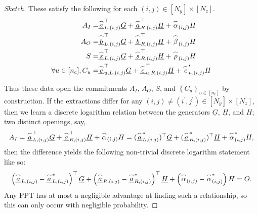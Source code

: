 \documentclass{article}
\theoremstyle{definition}
\begin{document}
\begin{proof}[Sketch]
These satisfy the following for each $(i, j) \in [N_y] \times [N_z]$.
\begin{align*}
A_I =& \underline{\overset{\LARGE \frown}{\small{a}}}_{L, (i,j)}^\top \underline{G} + \underline{\overset{\LARGE \frown}{\small{a}}}_{R, (i,j)}^\top \underline{H} + \overset{\LARGE \frown}{\small{\alpha}}_{(i,j)} H \\
A_O =& \underline{\overset{\LARGE \frown}{\small{b}}}_{L, (i,j)}^\top \underline{G} + \underline{\overset{\LARGE \frown}{\small{b}}}_{R, (i,j)}^\top \underline{H} + \overset{\LARGE \frown}{\small{\beta}}_{(i,j)} H  \\
S =& \underline{\overset{\LARGE \frown}{\small{s}}}_{L, (i,j)}^\top \underline{G} + \underline{\overset{\LARGE \frown}{\small{s}}}_{R, (i,j)}^\top \underline{H} + \overset{\LARGE \frown}{\small{\rho}}_{(i,j)} H  \\
\forall u \in [n_c],C_u =& \underline{\overset{\LARGE \frown}{\small{c}}}_{u,L, (i,j)}^\top \underline{G} + \underline{\overset{\LARGE \frown}{\small{c}}}_{u,R, (i,j)}^\top \underline{H} + \overset{\LARGE \frown}{\small{c}}_{u, (i,j)}^\prime H
\end{align*}

Thus these data open the commitments $A_I$, $A_O$, $S$, and $\left\{C_u\right\}_{u \in [n_c]}$ by construction. 
If the extractions differ for any $(i,j) \neq (i^\prime,j^\prime) \in [N_y] \times [N_z]$, then we learn a discrete logarithm relation between the generators $\underline{G}$, $\underline{H}$, and $H$; two distinct openings, say, $$A_I = \underline{\overset{\LARGE \frown}{\small{a}}}_{L, (i,j)}^\top \underline{G} + \underline{\overset{\LARGE \frown}{\small{a}}}_{R, (i,j)}^\top \underline{H} + \overset{\LARGE \frown}{\small{\alpha}}_{(i,j)} H = (\underline{\overset{\LARGE \frown}{\small{a}}}_{L, (i,j)}^*)^\top \underline{G} + (\underline{\overset{\LARGE \frown}{\small{a}}}_{R, (i,j)}^*)^\top \underline{H} + \overset{\LARGE \frown}{\small{\alpha}}_{(i,j)}^* H,$$ then the difference yields the following non-trivial discrete logarithm statement like so:
$$\left(\underline{\overset{\LARGE \frown}{\small{a}}}_{L, (i,j)} - \underline{\overset{\LARGE \frown}{\small{a}}}_{L, (i,j)}^*\right)^\top \underline{G} + \left(\underline{\overset{\LARGE \frown}{\small{a}}}_{R, (i,j)} - \underline{\overset{\LARGE \frown}{\small{a}}}_{R, (i,j)}^*\right)^\top \underline{H} + \left(\overset{\LARGE \frown}{\small{\alpha}}_{(i,j)} - \overset{\LARGE \frown}{\small{\alpha}}_{(i,j)}^*\right) H = O.$$
Any PPT has at most a negligible advantage at finding such a  relationship, so this can only occur with negligible probability.


\end{proof}
\end{document}
